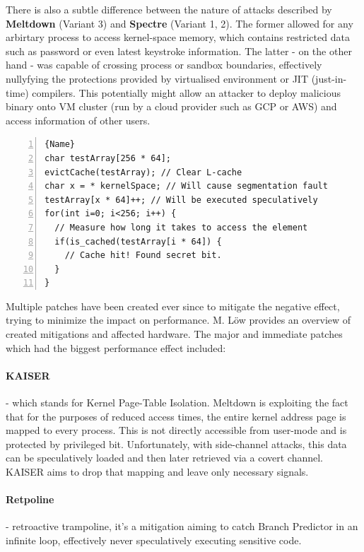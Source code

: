\documentclass{csfourzero}
\begin{document}
There is also a subtle difference between the nature of attacks described by \textbf{Meltdown} (Variant 3) and \textbf{Spectre} (Variant 1, 2). The former allowed for any arbirtary process to access kernel-space memory, which contains restricted data such as password or even latest keystroke information. The latter - on the other hand - was capable of crossing process or sandbox boundaries, effectively nullyfying the protections provided by virtualised environment or JIT (just-in-time) compilers. This potentially might allow an attacker to deploy malicious binary onto VM cluster (run by a cloud provider such as GCP or AWS) and access information of other users.

\pagebreak
\begin{lstlisting}[caption=Meltdown PoC,frame=tlrb, numbers=left, firstnumber=1]{Name}
char testArray[256 * 64];
evictCache(testArray); // Clear L-cache
char x = * kernelSpace; // Will cause segmentation fault
testArray[x * 64]++; // Will be executed speculatively
for(int i=0; i<256; i++) {
  // Measure how long it takes to access the element
  if(is_cached(testArray[i * 64]) {
    // Cache hit! Found secret bit.
  }
}
\end{lstlisting}

Multiple patches have been created ever since to mitigate the negative effect, trying to minimize the impact on performance. M. L{\"o}w\cite{low2018overview} provides an overview of created mitigations and affected hardware. The major and immediate patches which had the biggest performance effect included:

\paragraph{KAISER} \cite{corbet2017current} - which stands for Kernel Page-Table Isolation. Meltdown is exploiting the fact that for the purposes of reduced access times, the entire kernel address page is mapped to every process. This is not directly accessible from user-mode and is protected by privileged bit. Unfortunately, with side-channel attacks, this data can be speculatively loaded and then later retrieved via a covert channel. KAISER aims to drop that mapping and leave only necessary signals.
\paragraph{Retpoline} \cite{turner2018retpoline} - retroactive trampoline, it's a mitigation aiming to catch Branch Predictor in an infinite loop, effectively never speculatively executing sensitive code.
\end{document}
